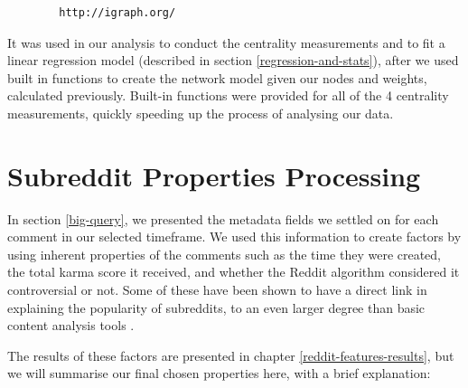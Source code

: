 \documentclass[bsc,frontabs,twoside,singlespacing,parskip,deptreport]{infthesis}
\begin{document}
\begin{center}
	\begin{verbatim}
		http://igraph.org/
	\end{verbatim}
\end{center} 

It was used in our analysis to conduct the centrality measurements and to fit a linear regression model (described in section \ref{regression-and-stats}), after we used built in functions to create the network model given our nodes and weights, calculated previously. Built-in functions were provided for all of the 4 centrality measurements, quickly speeding up the process of analysing our data.

\section{Subreddit Properties Processing}\label{features}

In section \ref{big-query}, we presented the metadata fields we settled on for each comment in our selected timeframe. We used this information to create factors by using inherent properties of the comments such as the time they were created, the total karma score it received, and whether the Reddit algorithm considered it controversial or not. Some of these have been shown to have a direct link in explaining the popularity of subreddits, to an even larger degree than basic content analysis tools \cite{masters}.

The results of these factors are presented in chapter \ref{reddit-features-results}, but we will summarise our final chosen properties here, with a brief explanation:
\end{document}
